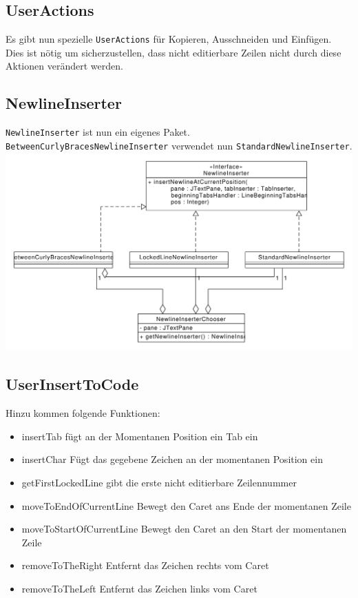 \documentclass[a4paper]{scrreprt}
\begin{document}
\subsection{UserActions}
Es gibt nun spezielle \verb!UserActions! für Kopieren, Ausschneiden und Einfügen. Dies ist nötig um sicherzustellen, dass nicht editierbare Zeilen nicht durch diese Aktionen verändert werden.\\
\subsection{NewlineInserter}
\verb!NewlineInserter! ist nun ein eigenes Paket. \verb!BetweenCurlyBracesNewlineInserter! verwendet nun \verb!StandardNewlineInserter!.\\
\includegraphics[scale=0.5]{insertnewline_update.pdf}


\subsection{UserInsertToCode}
Hinzu kommen folgende Funktionen:
\begin{itemize}
\item insertTab fügt an der Momentanen Position ein Tab ein
\item insertChar Fügt das gegebene Zeichen an der momentanen Position ein
\item getFirstLockedLine gibt die erste nicht editierbare Zeilennummer
\item moveToEndOfCurrentLine Bewegt den Caret ans Ende der momentanen Zeile
\item moveToStartOfCurrentLine Bewegt den Caret an den Start der momentanen Zeile
\item removeToTheRight Entfernt das Zeichen rechts vom Caret
\item removeToTheLeft Entfernt das Zeichen links vom Caret
\end{itemize}
\end{document}
